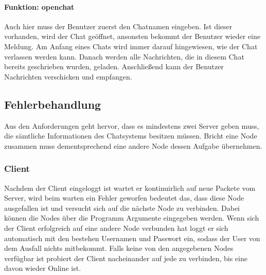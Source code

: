 \paragraph{Funktion: openchat}
Auch hier muss der Benutzer zuerst den Chatnamen eingeben. Ist dieser vorhanden, wird der Chat geöffnet, ansonsten
bekommt der Benutzer wieder eine Meldung. Am Anfang eines Chats wird immer darauf hingewiesen, wie der Chat
verlassen werden kann. Danach werden alle Nachrichten, die in diesem Chat bereits geschrieben wurden, geladen.
Anschließend kann der Benutzer Nachrichten verschicken und empfangen.

\author{Matthias Vonend, Aaron Schweig, Troy Keßler}
\subsection{Fehlerbehandlung}
Aus den Anforderungen geht hervor, dass es mindestens zwei Server geben muss, die sämtliche Informationen des
Chatsystems besitzen müssen. Bricht eine Node zusammen muss dementsprechend eine andere Node dessen Aufgabe übernehmen.

\subsubsection{Client}

Nachdem der Client eingeloggt ist wartet er kontinuirlich auf neue Packete vom Server,
wird beim warten ein Fehler geworfen bedeutet das, dass diese Node ausgefallen ist und
versucht sich auf die nächste Node zu verbinden. Dabei können die Nodes über die 
Programm Argumente eingegeben werden. Wenn sich der Client erfolgreich auf eine andere Node
verbunden hat loggt er sich automatisch mit den bestehen Usernamen und Passwort ein, 
sodass der User von dem Ausfall nichts mitbekommt. Falls keine von den angegebenen Nodes
verfügbar ist probiert der Client nacheinander auf jede zu verbinden, bis eine davon wieder 
Online ist.

